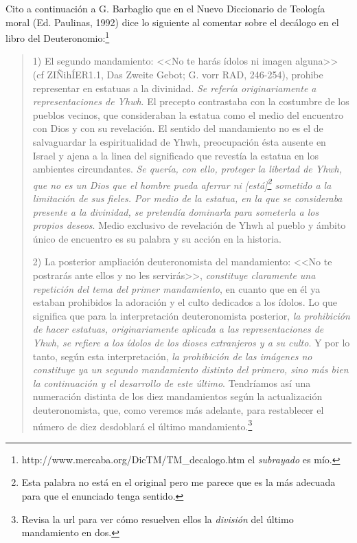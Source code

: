 \documentclass{article}
\begin{document}

Cito a continuaci\'on a G. Barbaglio que en el Nuevo Diccionario de Teolog\'{i}a moral (Ed. Paulinas, 1992) dice lo siguiente al comentar sobre el dec\'alogo en el libro del Deuteronomio:\footnote{http://www.mercaba.org/DicTM/TM\_decalogo.htm el \emph{subrayado} es m\'{i}o.}

\begin{quote}
1) El segundo mandamiento: <<No te harás ídolos ni imagen alguna>> (cf ZIÑihÍER1.1, Das Zweite Gebot; G. vorr RAD, 246-254), prohibe representar en estatuas a la divinidad. \emph{Se refería originariamente a representaciones de Yhwh}. El precepto contrastaba con la costumbre de los pueblos vecinos, que consideraban la estatua como el medio del encuentro con Dios y con su revelación. El sentido del mandamiento no es el de salvaguardar la espiritualidad de Yhwh, preocupación ésta ausente en Israel y ajena a la linea del significado que revestía la estatua en los ambientes circundantes. \emph{Se quería, con ello, proteger la libertad de Yhwh, que no es un Dios que el hombre pueda aferrar ni [est\'a]\footnote{Esta palabra no est\'a en el original pero me parece que es la m\'as adecuada para que el enunciado tenga sentido.} sometido a la limitación de sus fieles. Por medio de la estatua, en la que se consideraba presente a la divinidad, se pretendía dominarla para someterla a los propios deseos}. Medio exclusivo de revelación de Yhwh al pueblo y ámbito único de encuentro es su palabra y su acción en la historia.

2) La posterior ampliación deuteronomista del mandamiento: <<No te postrarás ante ellos y no les servirás>>, \emph{constituye claramente una repetición del tema del primer mandamiento}, en cuanto que en él ya estaban prohibidos la adoración y el culto dedicados a los ídolos. Lo que significa que para la interpretación deuteronomista posterior, \emph{la prohibición de hacer estatuas, originariamente aplicada a las representaciones de Yhwh, se refiere a los ídolos de los dioses extranjeros y a su culto}. Y por lo tanto, según esta interpretación, \emph{la prohibición de las imágenes no constituye ya un segundo mandamiento distinto del primero, sino más bien la continuación y el desarrollo de este último}. Tendríamos así una numeración distinta de los diez mandamientos según la actualización deuteronomista, que, como veremos más adelante, para restablecer el número de diez desdoblará el último mandamiento.\footnote{Revisa la url para ver c\'omo resuelven ellos la \emph{divisi\'on} del \'ultimo mandamiento en dos.}


\end{quote}
\end{document}
